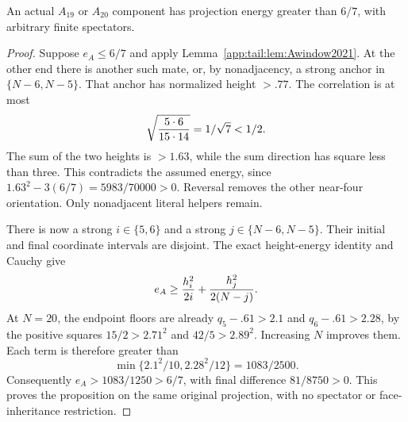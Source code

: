 \begin{proposition}
\label{app:tail:prop:A19A20}
An actual $A_{19}$ or $A_{20}$ component has projection energy
greater than $6/7$, with arbitrary finite spectators.
\end{proposition}
\begin{proof}
Suppose $e_A\le6/7$ and apply
Lemma~\ref{app:tail:lem:Awindow2021}. At the other end there is another such
mate, or, by nonadjacency, a strong anchor in $\{N-6,N-5\}$.
That anchor has normalized height $>.77$. The correlation is at most
\[
 \sqrt{{5\cdot6\over15\cdot14}}=1/\sqrt7<1/2.
\]
The sum of the two heights is $>1.63$, while the sum direction
has square less than three. This contradicts the assumed energy,
since $1.63^2-3(6/7)=5983/70000>0$. Reversal removes the other
near-four orientation. Only nonadjacent literal helpers remain.

There is now a strong $i\in\{5,6\}$ and a strong
$j\in\{N-6,N-5\}$. Their initial and final coordinate intervals
are disjoint. The exact height-energy identity and Cauchy give
\[
 e_A\ge{h_i^2\over2i}+{h_j^2\over2(N-j)}.
\]
At $N=20$, the endpoint floors are already $q_5-.61>2.1$ and
$q_6-.61>2.28$, by the positive squares
$15/2>2.71^2$ and $42/5>2.89^2$. Increasing $N$ improves them.
Each term is therefore greater than
\[
 \min\{2.1^2/10,2.28^2/12\}=1083/2500.
\]
Consequently $e_A>1083/1250>6/7$, with final difference
$81/8750>0$. This proves the proposition on the same original
projection, with no spectator or face-inheritance restriction.
\end{proof}

